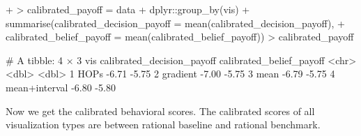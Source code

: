 \documentclass{article}
\begin{document}
\begin{Schunk}
\begin{Sinput}
{+ }
> calibrated_payoff = data %>%
+   dplyr::group_by(vis) %>%
+   summarise(calibrated_decision_payoff = mean(calibrated_decision_payoff),
+             calibrated_belief_payoff = mean(calibrated_belief_payoff))
> calibrated_payoff
\end{Sinput}
\begin{Soutput}
# A tibble: 4 × 3
  vis           calibrated_decision_payoff calibrated_belief_payoff
  <chr>                              <dbl>                    <dbl>
1 HOPs                               -6.71                    -5.75
2 gradient                           -7.00                    -5.75
3 mean                               -6.79                    -5.75
4 mean+interval                      -6.80                    -5.80
\end{Soutput}
\end{Schunk}

Now we get the calibrated behavioral scores. The calibrated scores of all visualization types are between rational baseline and rational benchmark.
\end{document}
